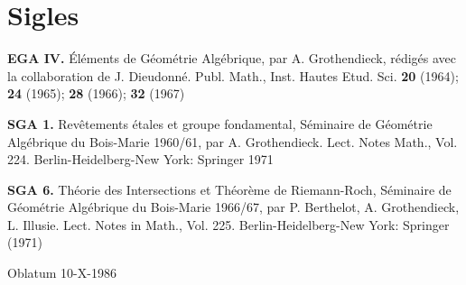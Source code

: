 \documentclass[12pt,a4paper]{article}
\theoremstyle{plain}
\theoremstyle{definition}
\theoremstyle{remark}
\begin{document}
\section*{Sigles}

\textbf{EGA IV.} \'El\'ements de G\'eom\'etrie Alg\'ebrique, par A. Grothendieck, r\'edig\'es avec la collaboration de J. Dieudonn\'e. Publ. Math., Inst. Hautes Etud. Sci. \textbf{20} (1964); \textbf{24} (1965); \textbf{28} (1966); \textbf{32} (1967)

\textbf{SGA 1.} Rev\^etements \'etales et groupe fondamental, S\'eminaire de G\'eom\'etrie Alg\'ebrique du Bois-Marie 1960/61, par A. Grothendieck. Lect. Notes Math., Vol. 224. Berlin-Heidelberg-New York: Springer 1971

\textbf{SGA 6.} Th\'eorie des Intersections et Th\'eor\`eme de Riemann-Roch, S\'eminaire de G\'eom\'etrie Alg\'ebrique du Bois-Marie 1966/67, par P. Berthelot, A. Grothendieck, L. Illusie. Lect. Notes in Math., Vol. 225. Berlin-Heidelberg-New York: Springer (1971)

\vspace{1cm}
\begin{center}
Oblatum 10-X-1986
\end{center}
\end{document}

